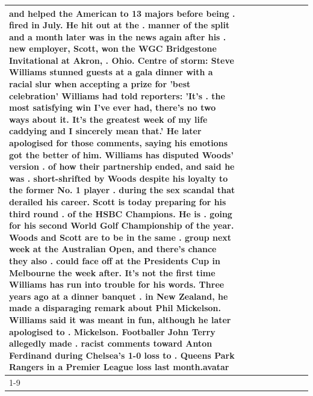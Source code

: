 \begin{table}[H]
\begin{tabular}{lllrlllll}
and helped the American to 13 majors before being . fired in July. He hit out at the . manner of the split and a month later was in the news again after his . new employer, Scott, won the WGC Bridgestone Invitational at Akron, . Ohio. Centre of storm: Steve Williams stunned guests at a gala dinner with a racial slur when accepting a prize for 'best celebration' Williams had told reporters: 'It's . the most satisfying win I've ever had, there's no two ways about it. It's the greatest week of my life caddying and I sincerely mean that.' He later apologised for those comments, saying his emotions got the better of him. Williams has disputed Woods' version . of how their partnership ended, and said he was . short-shrifted by Woods despite his loyalty to the former No. 1 player . during the sex scandal that derailed his career. Scott is today preparing for his third round . of the HSBC Champions. He is . going for his second World Golf Championship of the year. Woods and Scott are to be in the same . group next week at the Australian Open, and there's chance they also . could face off at the Presidents Cup in Melbourne the week after. It's not the first time Williams has run into trouble for his words. Three years ago at a dinner banquet . in New Zealand, he made a disparaging remark about Phil Mickelson. Williams said it was meant in fun, although he later apologised to . Mickelson. Footballer John Terry allegedly made . racist comments toward Anton Ferdinand during Chelsea's 1-0 loss to . Queens Park Rangers in a Premier League loss last month.avatar \\
\cline{1-9}

\end{tabular}
\end{table}
